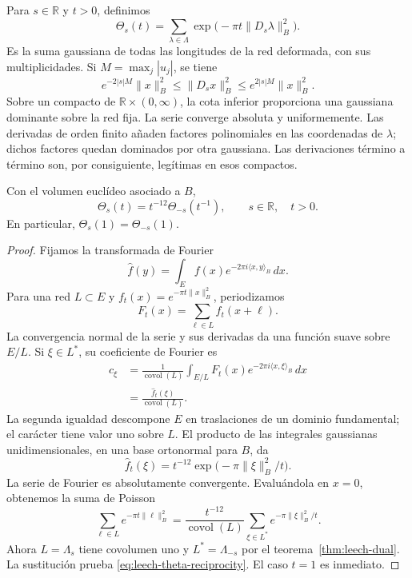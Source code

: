 Para \(s\in\mathbb R\) y \(t>0\), definimos
\begin{equation}
 \Theta_s(t)=\sum_{\lambda\in\Lambda}
                \exp\bigl(-\pi t\|D_s\lambda\|_B^2\bigr).
 \label{eq:leech-theta-real}
\end{equation}
Es la suma gaussiana de todas las longitudes de la red deformada,
con sus multiplicidades. Si \(M=\max_j|u_j|\), se tiene
\begin{equation}
 e^{-2|s|M}\|x\|_B^2
 \leq\|D_sx\|_B^2
 \leq e^{2|s|M}\|x\|_B^2.
 \label{eq:leech-quadratic-bounds}
\end{equation}
Sobre un compacto de \(\mathbb R\times(0,\infty)\), la cota
inferior proporciona una gaussiana dominante sobre la red fija.
La serie converge absoluta y uniformemente. Las derivadas de
orden finito añaden factores polinomiales en las coordenadas de
\(\lambda\); dichos factores quedan dominados por otra gaussiana.
Las derivaciones término a término son, por consiguiente,
legítimas en esos compactos.

\begin{theorem}
\label{thm:leech-theta}
Con el volumen euclídeo asociado a \(B\),
\begin{equation}
 \Theta_s(t)=t^{-12}\Theta_{-s}(t^{-1}),
 \qquad s\in\mathbb R,\quad t>0.
 \label{eq:leech-theta-reciprocity}
\end{equation}
En particular, \(\Theta_s(1)=\Theta_{-s}(1)\).
\end{theorem}
\begin{proof}
Fijamos la transformada de Fourier
\[
 \widehat f(y)=\int_E
      f(x)e^{-2\pi i\langle x,y\rangle_B}\,dx.
\]
Para una red \(L\subset E\) y
\(f_t(x)=e^{-\pi t\|x\|_B^2}\), periodizamos
\[
 F_t(x)=\sum_{\ell\in L}f_t(x+\ell).
\]
La convergencia normal de la serie y sus derivadas da una función
suave sobre \(E/L\). Si \(\xi\in L^*\), su coeficiente de Fourier es
\[
\begin{split}
 c_\xi
 &=\frac1{\operatorname{covol}(L)}
   \int_{E/L}F_t(x)e^{-2\pi i\langle x,\xi\rangle_B}\,dx\\
 &=\frac{\widehat f_t(\xi)}{\operatorname{covol}(L)}.
\end{split}
\]
La segunda igualdad descompone \(E\) en traslaciones de un dominio
fundamental; el carácter tiene valor uno sobre \(L\). El producto
de las integrales gaussianas unidimensionales, en una base
ortonormal para \(B\), da
\[
 \widehat f_t(\xi)=
 t^{-12}\exp\bigl(-\pi\|\xi\|_B^2/t\bigr).
\]
La serie de Fourier es absolutamente convergente. Evaluándola en
\(x=0\), obtenemos la suma de Poisson
\[
 \sum_{\ell\in L}e^{-\pi t\|\ell\|_B^2}
 =\frac{t^{-12}}{\operatorname{covol}(L)}
      \sum_{\xi\in L^*}e^{-\pi\|\xi\|_B^2/t}.
\]
Ahora \(L=\Lambda_s\) tiene covolumen uno y
\(L^*=\Lambda_{-s}\) por el teorema~\ref{thm:leech-dual}.
La sustitución prueba \eqref{eq:leech-theta-reciprocity}.
El caso \(t=1\) es inmediato.
\end{proof}

